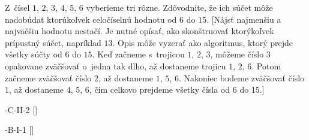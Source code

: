{Z~čísel $1$, $2$, $3$, $4$, $5$, $6$ vyberieme tri rôzne.
Zdôvodnite, že ich súčet môže nadobúdať
ktorúkoľvek celočíselnú hodnotu od $6$ do $15$.
[Nájsť najmenšiu a najväčšiu hodnotu nestačí. Je nutné opísať,
ako skonštruovať ktorýkoľvek prípustný súčet, napríklad $13$.
Opis môže vyzerať ako algoritmus, ktorý prejde všetky súčty
od $6$ do $15$. Keď začneme s~trojicou $1$, $2$, $3$, môžeme číslo
$3$ opakovane zväčšovať o~jedna tak dlho, až dostaneme
trojicu $1$, $2$, $6$. Potom začneme zväčšovať číslo $2$, až dostaneme
$1$, $5$, $6$. Nakoniec budeme zväčšovať číslo $1$, až dostaneme
$4$, $5$, $6$, čím celkovo prejdeme všetky čísla od 6 do 15.]

\DOP
{}-C-II-2
[]

-B-I-1
[]
}

